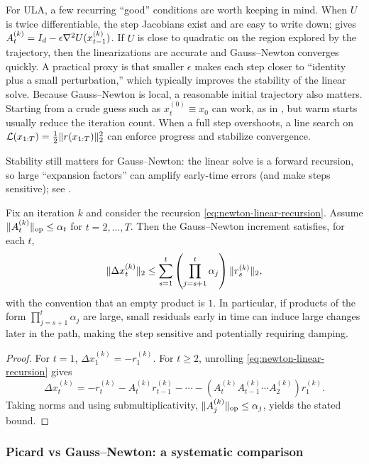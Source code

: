 \documentclass[11pt]{article}
\begin{document}
For ULA, a few recurring ``good'' conditions are worth keeping in mind.
When $U$ is twice differentiable, the step Jacobians exist and are easy to write down;  gives $A_t^{(k)}=I_d-\epsilon \nabla^2 U(x_{t-1}^{(k)})$.
If $U$ is close to quadratic on the region explored by the trajectory, then the linearizations are accurate and Gauss--Newton converges quickly.
A practical proxy is that smaller $\epsilon$ makes each step closer to ``identity plus a small perturbation,'' which typically improves the stability of the linear solve.
Because Gauss--Newton is local, a reasonable initial trajectory also matters.
Starting from a crude guess such as $x_t^{(0)}\equiv x_0$ can work, as in , but warm starts usually reduce the iteration count.
When a full step overshoots, a line search on $\mathcal{L}(x_{1:T})=\tfrac12\lVert r(x_{1:T})\rVert_2^2$ can enforce progress and stabilize convergence.

Stability still matters for Gauss--Newton:
the linear solve is a forward recursion, so large ``expansion factors'' can amplify early-time errors (and make steps sensitive); see .

\begin{proposition}
\label{prop:newton-amplification}
Fix an iteration $k$ and consider the recursion \eqref{eq:newton-linear-recursion}.
Assume $\lVert A_t^{(k)}\rVert_{\mathrm{op}}\le \alpha_t$ for $t=2,\dots,T$.
Then the Gauss--Newton increment satisfies, for each $t$,
\[
\lVert\Delta x_t^{(k)}\rVert_2
\le \sum_{s=1}^t \left(\prod_{j=s+1}^t \alpha_j\right)\lVert r_s^{(k)}\rVert_2,
\]
with the convention that an empty product is $1$.
In particular, if products of the form $\prod_{j=s+1}^t \alpha_j$ are large, small residuals early in time can induce large changes later in the path, making the step sensitive and potentially requiring damping.%
\end{proposition}
\begin{proof}
For $t=1$, $\Delta x_1^{(k)}=-r_1^{(k)}$.
For $t\ge 2$, unrolling \eqref{eq:newton-linear-recursion} gives
\[
\Delta x_t^{(k)}
=-r_t^{(k)}-A_t^{(k)}r_{t-1}^{(k)}-\cdots-\left(A_t^{(k)}A_{t-1}^{(k)}\cdots A_2^{(k)}\right)r_1^{(k)}.
\]
Taking norms and using submultiplicativity, $\lVert A_j^{(k)}\rVert_{\mathrm{op}}\le \alpha_j$, yields the stated bound.%
\end{proof}

\subsubsection{Picard vs Gauss--Newton: a systematic comparison}
\label{subsubsec:picard-vs-newton}
\end{document}
